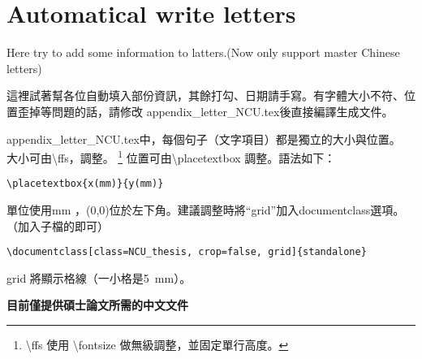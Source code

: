 \documentclass[class=NCU_thesis, crop=false]{standalone}
\begin{document}
\chapter{Automatical write letters}
Here try to add some information to latters.(Now only support master Chinese letters)

這裡試著幫各位自動填入部份資訊，其餘打勾、日期請手寫。有字體大小不符、位置歪掉等問題的話，請修改 appendix\_letter\_NCU.tex後直接編譯生成文件。

appendix\_letter\_NCU.tex中，每個句子（文字項目）都是獨立的大小與位置。 大小可由\textbackslash{}ffs，調整。
\footnote{\textbackslash{}ffs 使用 \textbackslash{}fontsize 做無級調整，並固定單行高度。 }
位置可由\textbackslash{}placetextbox 調整。語法如下：
\begin{lstlisting}[style=LatexStyle,caption={}]
\placetextbox{x(mm)}{y(mm)}
\end{lstlisting}
單位使用mm ，(0,0)位於左下角。建議調整時將``grid''加入documentclass選項。（加入子檔的即可）
\begin{lstlisting}[style=LatexStyle,caption={}]
\documentclass[class=NCU_thesis, crop=false, grid]{standalone}
\end{lstlisting}
grid 將顯示格線（一小格是\SI{5}{\milli\metre}）。

\begin{center}
{ \noindent\color{red}\bfseries\Large 目前僅提供碩士論文所需的中文文件}
\end{center}

\cleardoublepage
\pagestyle{empty}
\sffamily


\end{document}
